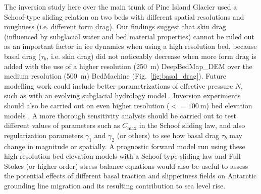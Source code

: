 The inversion study here over the main trunk of Pine Island Glacier used a Schoof-type sliding relation on two beds with different spatial resolutions and roughness (i.e. different form drag).
Our findings suggest that skin drag (influenced by subglacial water and bed material properties) cannot be ruled out as an important factor in ice dynamics when using a high resolution bed, because basal drag ($\tau_b$, i.e. skin drag) did not noticeably decrease when more form drag is added with the use of a higher resolution (\SI{250}{\metre}) DeepBedMap\_DEM over the medium resolution (\SI{500}{\metre}) BedMachine (Fig.~\ref{fig:basal_drag}).
Future modelling work could include better parametrizations of effective pressure $N$, such as with an evolving subglacial hydrology model \citep[e.g.][]{SommersSHAKTISubglacialHydrology2018}.
Inversion experiments should also be carried out on even higher resolution ($<=\SI{100}{\metre}$) bed elevation models \citep[e.g.][]{Grahamhighresolutionsyntheticbed2017}.
A more thorough sensitivity analysis should be carried out to test different values of parameters such as $C_{\text{max}}$ in the Schoof sliding law, and also regularization parameters $\gamma_1$ and $\gamma_2$ (or others) to see how basal drag $\tau_b$ may change in magnitude or spatially.
A prognostic forward model run using these high resolution bed elevation models with a Schoof-type sliding law and Full Stokes (or higher order) stress balance equations would also be useful to assess the potential effects of different basal traction and slipperiness fields on Antarctic grounding line migration and its resulting contribution to sea level rise.
